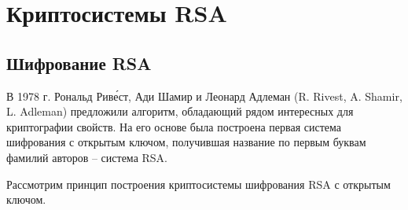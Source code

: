 \section{Криптосистемы RSA}

\subsection[Шифрование]{Шифрование RSA}

В 1978 г. Рональд Рив\'{е}ст, Ади Шамир и Леонард Адлеман  (R. Rivest, A. Shamir, L. Adleman) предложили алгоритм, обладающий рядом интересных для криптографии свойств. На его основе была построена первая система шифрования с открытым ключом, получившая название по первым буквам фамилий авторов -- система RSA.

Рассмотрим принцип построения криптосистемы шифрования RSA с открытым ключом.

